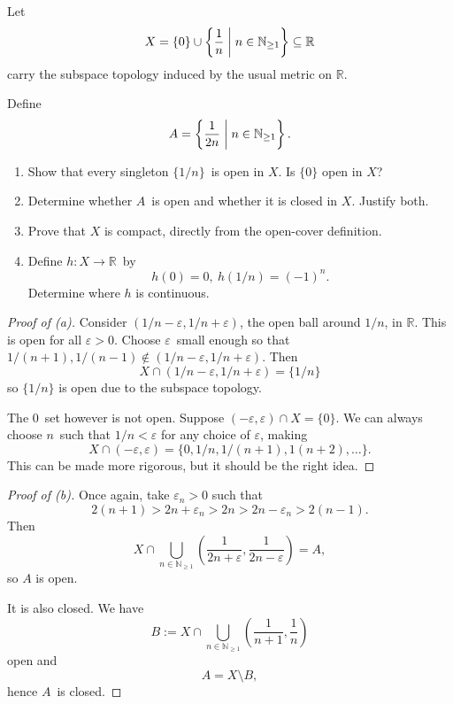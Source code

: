 \documentclass[11pt]{article}
\begin{document}
\begin{prob*}
    Let 
    \[
        X = \{0\} \cup \left\{\frac 1 n \biggm| n \in 
        \mathbb N_{\ge 1}\right\} \subseteq \mathbb R 
    \]
    carry the subspace topology induced by the usual metric 
    on $\mathbb R$. 

    Define 
    \[
        A = \left\{\frac{1}{2n} \biggm| n \in \mathbb 
        N_{\geq 1}\right\}.
    \]

    \begin{enumerate}[label=\alph*)]
        \item Show that every singleton $\{1/n\}$ is open 
            in $X$. Is $\{0\}$ open in $X$? 
        \item Determine whether $A$ is open and whether 
            it is closed in $X$. Justify both. 
        \item Prove that $X$ is compact, directly from the 
            open-cover definition.
        \item Define $h : X \to \mathbb R$ by 
            \[
                h(0) = 0, \ h(1/n) = (-1)^n.
            \]
            Determine where $h$ is continuous.
    \end{enumerate}
\end{prob*}
\begin{proof}[Proof of (a)]
    Consider $(1/n -\varepsilon, 1/n + \varepsilon)$, 
    the open ball around $1/n$, in $\mathbb R$. 
    This is open for all $\varepsilon > 0$. Choose 
    $\varepsilon$ small enough so that 
    $1/(n+1), 1/(n-1) \not\in (1/n - \varepsilon, 1/n + \varepsilon)$.
    Then 
    \[
        X \cap (1/n-\varepsilon, 1/n + \varepsilon) 
        = \{1/n\} 
    \]
    so $\{1/n\}$ is open due to the subspace topology. 

    The $0$ set however is not open. 
    Suppose $(-\varepsilon,\varepsilon) \cap X = \{0\}$. 
    We can always choose $n$ such that $1/n < \varepsilon$ for 
    any choice of $\varepsilon$, making 
    \[
        X \cap (-\varepsilon, \varepsilon) 
        = \{0, 1/n, 1/(n+1), 1(n+2), \ldots\}.
    \]
    This can be made more rigorous, but it should be the 
    right idea. 
\end{proof}
\begin{proof}[Proof of (b)]
    Once again, take $\varepsilon_n > 0$ such that 
    \[
        2(n+1) > 2n + \varepsilon_n > 2n > 2n - \varepsilon_n 
        > 2(n-1).
    \]
    Then 
    \[
        X \cap \bigcup_{n\in \mathbb N_{\geq 1}} 
        \left(\frac{1}{2n + \varepsilon}, \frac{1}{2n - 
        \varepsilon}\right) 
        = A,
    \]
    so $A$ is open. 

    It is also closed. 
    We have 
    \[
        B := X \cap \bigcup_{n\in \mathbb N_{\geq 1}} 
        \left(\frac{1}{n+1}, \frac{1}{n}\right)
    \]
    open and 
    \[
        A = X \setminus B,  
    \]
    hence $A$ is closed. 
\end{proof}
\end{document}
